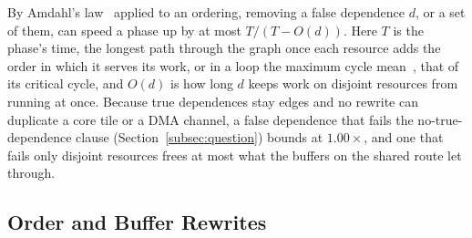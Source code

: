 By Amdahl's law~\citep{amdahl1967validity} applied to an ordering, removing a false dependence $d$, or a set of them, can speed a phase up by at most $T / (T - O(d))$.
Here $T$ is the phase's time, the longest path through the graph once each resource adds the order in which it serves its work, or in a loop the maximum cycle mean~\citep{ghamarian2006throughput}, that of its critical cycle, and $O(d)$ is how long $d$ keeps work on disjoint resources from running at once.
Because true dependences stay edges and no rewrite can duplicate a core tile or a DMA channel, a false dependence that fails the no-true-dependence clause (Section~\ref{subsec:question}) bounds at $1.00\times$, and one that fails only disjoint resources frees at most what the buffers on the shared route let through.

\subsection{Order and Buffer Rewrites}
\label{subsec:order}

